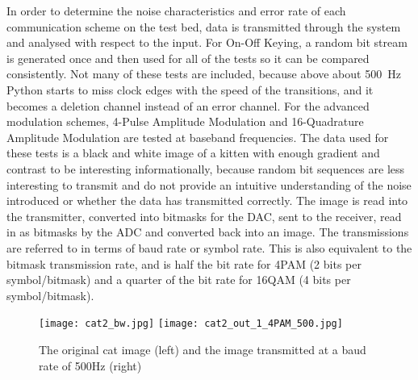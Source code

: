 \documentclass[../main.tex]{subfiles}
\begin{document}
In order to determine the noise characteristics and error rate of each communication scheme on the test bed, data is transmitted through the system and analysed with respect to the input.
For On-Off Keying, a random bit stream is generated once and then used for all of the tests so it can be compared consistently.
Not many of these tests are included, because above about \SI{500}{\hertz} Python starts to miss clock edges with the speed of the transitions, and it becomes a deletion channel instead of an error channel.
For the advanced modulation schemes, 4-Pulse Amplitude Modulation and 16-Quadrature Amplitude Modulation are tested at baseband frequencies.
The data used for these tests is a black and white image of a kitten with enough gradient and contrast to be interesting informationally, because random bit sequences are less interesting to transmit and do not provide an intuitive understanding of the noise introduced or whether the data has transmitted correctly.
The image is read into the transmitter, converted into bitmasks for the DAC, sent to the receiver, read in as bitmasks by the ADC and converted back into an image.
The transmissions are referred to in terms of baud rate or symbol rate.
This is also equivalent to the bitmask transmission rate, and is half the bit rate for 4PAM (2 bits per symbol/bitmask) and a quarter of the bit rate for 16QAM (4 bits per symbol/bitmask).\\

\begin{figure}[ht]
	\centering
	
	\texttt{[image: cat2\_bw.jpg]}
	\texttt{[image: cat2\_out\_1\_4PAM\_500.jpg]}
	
	\caption{The original cat image (left) and the image transmitted at a baud rate of 500Hz (right)}
	\label{fig_Original Cat}
\end{figure}
\end{document}
